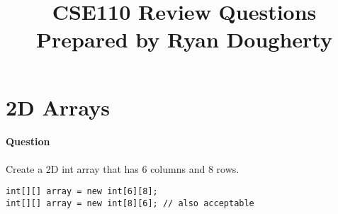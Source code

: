 \documentclass{article}
\date{}
\begin{document}
\title{\textbf{CSE110 Review Questions \\
Prepared by Ryan Dougherty}}
\maketitle

\section*{2D Arrays}


\setcounter{question_num}{1}
\paragraph{Question }
Create a 2D int array that has 6 columns and 8 rows.
\begin{lstlisting}
int[][] array = new int[6][8];
int[][] array = new int[8][6]; // also acceptable
\end{lstlisting}
\end{document}
